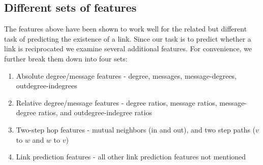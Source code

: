 \documentclass[conference]{IEEEtran}
\begin{document}
\subsection{Different sets of features}
The features above have been shown to work well for the related but different task of predicting the existence of a link. Since our task is to predict whether a link is reciprocated we examine several additional features. For convenience, we further break them down into four sets:
\begin{enumerate}
	\item Absolute degree/message features - degree, messages, message-degrees, outdegree-indegrees
	\item Relative degree/message features - degree ratios, message ratios, message-degree ratios, and outdegree-indegree ratios
	\item Two-step hop features - mutual neighbors (in and out), and two step paths ($v$ to $w$ and $w$ to $v$)
	\item Link prediction features - all other link prediction features not mentioned
\end{enumerate}
\end{document}
